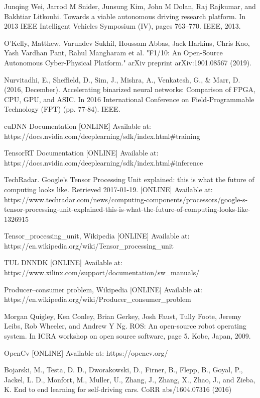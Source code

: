 \documentclass[conference]{IEEEtran}
\begin{document}
\begin{sloppypar}
\begin{thebibliography}{00}
 Junqing Wei, Jarrod M Snider, Junsung Kim, John M Dolan, Raj Rajkumar, and Bakhtiar Litkouhi. Towards a viable autonomous driving research platform. In 2013 IEEE Intelligent Vehicles Symposium (IV), pages 763–770. IEEE, 2013.

 O'Kelly, Matthew, Varundev Sukhil, Houssam Abbas, Jack Harkins, Chris Kao, Yash Vardhan Pant, Rahul Mangharam et al. "F1/10: An Open-Source Autonomous Cyber-Physical Platform." arXiv preprint arXiv:1901.08567 (2019).

 Nurvitadhi, E., Sheffield, D., Sim, J., Mishra, A., Venkatesh, G., \& Marr, D. (2016, December). Accelerating binarized neural networks: Comparison of FPGA, CPU, GPU, and ASIC. In 2016 International Conference on Field-Programmable Technology (FPT) (pp. 77-84). IEEE.

 cuDNN Documentation [ONLINE] Available at: https://docs.nvidia.com/deeplearning/sdk/index.html\#training

 TensorRT Documentation [ONLINE] Available at: https://docs.nvidia.com/deeplearning/sdk/index.html\#inference

 TechRadar. Google's Tensor Processing Unit explained: this is what the future of computing looks like. Retrieved 2017-01-19. [ONLINE] Available at: https://www.techradar.com/news/computing-components/processors/google-s-tensor-processing-unit-explained-this-is-what-the-future-of-computing-looks-like-1326915

 Tensor\_processing\_unit, Wikipedia [ONLINE] Available at: https://en.wikipedia.org/wiki/Tensor\_processing\_unit

 TUL DNNDK [ONLINE] Available at: https://www.xilinx.com/support/documentation/sw\_manuals/

 Producer–consumer problem, Wikipedia [ONLINE] Available at: https://en.wikipedia.org/wiki/Producer\_consumer\_problem

 Morgan Quigley, Ken Conley, Brian Gerkey, Josh Faust, Tully Foote, Jeremy Leibs, Rob Wheeler, and Andrew Y Ng. ROS: An open-source robot operating system. In ICRA workshop on open source software, page 5. Kobe, Japan, 2009.

 OpenCv [ONLINE] Available at: https://opencv.org/

 Bojarski, M., Testa, D. D., Dworakowski, D., Firner, B., Flepp, B., Goyal, P., Jackel, L. D., Monfort, M., Muller, U., Zhang, J., Zhang, X., Zhao, J., and Zieba, K. End to end learning for self-driving cars. CoRR abs/1604.07316 (2016)


\end{thebibliography}
\end{sloppypar}
\end{document}

